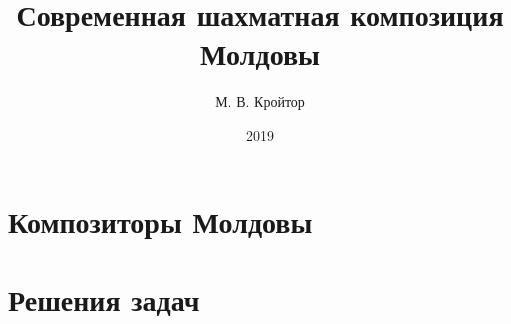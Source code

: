 \documentclass[12pt,a5paper]{book}
\title{Современная шахматная композиция Молдовы}
\author{М. В. Кройтор}
\date{2019}
\begin{document}


\chapter{Композиторы Молдовы}






\chapter{Решения задач}



\end{document}
